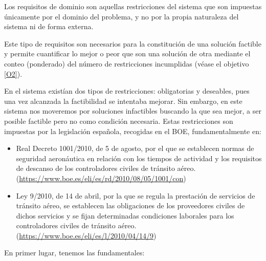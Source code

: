 Los requisitos de dominio son aquellas restricciones del sistema que son impuestas únicamente por el dominio del problema, y no por la propia naturaleza del sistema ni de forma externa.

Este tipo de requisitos son necesarios para la constitución de una solución factible y permite cuantificar lo mejor o peor que son una solución de otra mediante el conteo (ponderado) del número de restricciones incumplidas (véase el objetivo \ref{O2}). 

En el sistema \legacy{} existían dos tipos de restricciones: obligatorias y deseables, pues una vez alcanzada la factibilidad se intentaba mejorar. Sin embargo, en este sistema nos moveremos por soluciones infactibles buscando la que sea mejor, a ser posible factible pero no como condición necesaria. Estas restricciones son impuestas por la legislación española, recogidas en el BOE, fundamentalmente en:

\begin{itemize}
	\item Real Decreto 1001/2010, de 5 de agosto, por el que se establecen normas de seguridad aeronáutica en relación con los tiempos de actividad y los requisitos de descanso de los controladores civiles de tránsito aéreo. \\
	(\url{https://www.boe.es/eli/es/rd/2010/08/05/1001/con})
	
	\item Ley 9/2010, de 14 de abril, por la que se regula la prestación de servicios de tránsito aéreo, se establecen las obligaciones de los proveedores civiles de dichos servicios y se fijan determinadas condiciones laborales para los controladores civiles de tránsito aéreo. \\
	(\url{https://www.boe.es/eli/es/l/2010/04/14/9})
\end{itemize} 



En primer lugar, tenemos las fundamentales:

